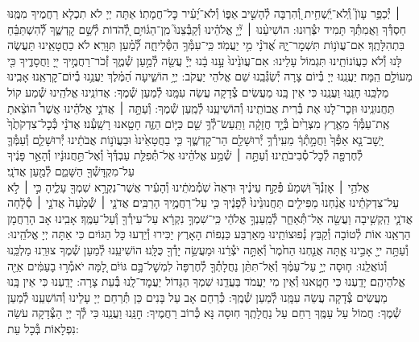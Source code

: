 \documentclass[twoside, openany, parskip=half, 11pt]{book}
\begin{document}
׀ יְ֯כַפֵּ֥ר עָוֺן֮ וְֽ֯לֹא־יַֽ֫שְׁחִ֥ית וְ֭֯הִרְבָּה לְ֯הָשִׁ֣יב אַפּ֑וֹ וְ֯לֹא־יָ֝עִ֗יר כׇּל־חֲמָתֽוֹ׃ אַתָּה יְיָ לֹא תִכְלָא רַחֲמֶיךָ מִמֶּֽנּוּ חַסְדְּ֯ךָ וַאֲמִתְּ֯ךָ תָּמִיד יִצְּ֯רֽוּנוּ: הוֹשִׁיעֵ֨נוּ ׀ יְ֘יָ֤ אֱלֹהֵ֗ינוּ וְ֯קַבְּ֯צֵנוּ֮ מִֽן־הַגּ֫וֹיִ֥ם לְ֭֯הֹדוֹת לְ֯שֵׁ֣ם קׇדְשֶׁ֑ךָ לְ֯֝הִשְׁתַּבֵּ֗חַ בִּתְהִלָּתֶֽךָ׃
אִם־עֲוֺנ֥וֹת תִּשְׁמׇר־יָ֑הּ אֲ֝דֹנָ֗י מִ֣י יַעֲמֹֽד׃ כִּֽי־עִמְּ֯ךָ֥ הַסְּ֯לִיחָ֑ה לְ֯֝מַ֗עַן תִּוָּרֵֽא׃ לֹא כַחֲטָאֵֽינוּ תַּעֲשֶׂה לָּנוּ וְ֯לֹא כַעֲוֹנוֹתֵֽינוּ תִּגְמוֹל עָלֵינוּ:
אִם־עֲוֺנֵ֙ינוּ֙ עָ֣נוּ בָ֔נוּ יְיָ֕ עֲשֵׂ֖ה לְ֯מַ֣עַן שְׁ֯מֶ֑ךָ זְ֯כֹר־רַחֲמֶ֣יךָ ייָ֭ וַחֲסָדֶ֑יךָ כִּ֖י מֵעוֹלָ֣ם הֵֽמָּה׃ יַעֲנֵֽנוּ יְיָ בְּ֯יוֹם צָרָה יְ֯שַׂגְּ֯בֵֽנוּ שֵׁם אֱלֹהֵי יַעֲקֹב:
יְיָ֥  הוֹשִׁ֑יעָה הַ֝מֶּ֗לֶךְ יַעֲנֵ֥נוּ בְ֯יוֹם־קׇרְאֵֽנוּ׃
אָבִֽינוּ מַלְכֵּֽנוּ חׇנֵּֽנוּ וַעֲנֵֽנוּ כִּי אֵין בָּֽנוּ מַעֲשִׂים צְ֯דָקָה עֲשֵׂה עִמָּֽנוּ לְ֯מַעַן שְׁ֯מֶךָ:
אֲדוֹנֵֽינוּ אֱלֹהֵֽינוּ שְׁ֯מַע קוֹל תַּחֲנוּנֵֽינוּ וּזְכׇר־לָנוּ אֶת בְּ֯רִית אֲבוֹתֵֽינוּ וְ֯הוֹשִׁיעֵֽנוּ לְ֯מַֽעַן שְׁ֯מֶךָ:
וְ֯עַתָּ֣ה ׀ אֲדֹנָ֣י אֱלֹהֵ֗ינוּ אֲשֶׁר֩ הוֹצֵ֨אתָ אֶֽת־עַמְּ֯ךָ֜ מֵאֶ֤רֶץ מִצְרַ֙יִם֙ בְּ֯יָ֣ד חֲזָקָ֔ה וַתַּֽעַשׂ־לְ֯ךָ֥ שֵׁ֖ם כַּיּ֣וֹם הַזֶּ֑ה חָטָ֖אנוּ רָשָֽׁעְ֯נוּ׃ אֲדֹנָ֗י כְּ֯כׇל־צִדְקֹתֶ֙ךָ֙ יָֽשׇׁב־נָ֤א אַפְּ֯ךָ֙ וַחֲמָ֣תְ֯ךָ֔ מֵעִֽירְ֯ךָ֥ יְ֯רוּשָׁלַ֖‍ִם הַר־קׇדְשֶׁ֑ךָ כִּ֤י בַחֲטָאֵ֙ינוּ֙ וּבַעֲוֺנ֣וֹת אֲבֹתֵ֔ינוּ יְ֯רוּשָׁלַ֧‍ִם וְ֯עַמְּ֯ךָ֛ לְ֯חֶרְפָּ֖ה לְ֯כׇל־סְ֯בִיבֹתֵֽינוּ׃ וְ֯עַתָּ֣ה ׀ שְׁ֯מַ֣ע אֱלֹהֵ֗ינוּ אֶל־תְּ֯פִלַּ֤ת עַבְדְּ֯ךָ֙ וְ֯אֶל־תַּ֣חֲנוּנָ֔יו וְ֯הָאֵ֣ר פָּנֶ֔יךָ עַל־מִקְדָּשְׁ֯ךָ֖ הַשָּׁמֵ֑ם לְ֯מַ֖עַן אֲדֹנָֽי׃\\
אֱלֹהַ֥י ׀ אׇזְנְ֯ךָ֮ וּֽשְׁמָע֒ פְּ֯קַ֣ח עֵינֶ֗יךָ וּרְאֵה֙ שֹֽׁמְ֯מֹתֵ֔ינוּ וְ֯הָעִ֕יר אֲשֶׁר־נִקְרָ֥א שִׁמְךָ֖ עָלֶ֑יהָ כִּ֣י ׀ לֹ֣א עַל־צִדְקֹתֵ֗ינוּ אֲנַ֨חְנוּ מַפִּילִ֤ים תַּחֲנוּנֵ֙ינוּ֙ לְ֯פָנֶ֔יךָ כִּ֖י עַל־רַחֲמֶ֥יךָ הָרַבִּֽים׃ אֲדֹנָ֤י ׀ שְׁ֯מָ֙עָה֙ אֲדֹנָ֣י ׀ סְ֯לָ֔חָה אֲדֹנָ֛י הַֽקְשִׁ֥יבָה וַעֲשֵׂ֖ה אַל־תְּ֯אַחַ֑ר לְ֯מַֽעַנְךָ֣ אֱלֹהַ֔י כִּֽי־שִׁמְךָ֣ נִקְרָ֔א עַל־עִירְ֯ךָ֖ וְ֯עַל־עַמֶּֽךָ׃ אָבִֽינוּ אָב הָרַחֲמָן הַרְאֵֽנוּ אוֹת לְ֯טוֹבָה וְ֯קַבֵּץ נְ֯פוּצוֹתֵֽינוּ מֵאַרְבַּע כַּנְפוֹת הָאָרֶץ יַכִּירוּ וְ֯יֵדְעוּ כָּל הַגּוֹיִם כִּי אַתָּה יְיָ אֱלֹהֵֽינוּ:
וְ֯עַתָּ֥ה ייָ֖ אָבִ֣ינוּ אָ֑תָּה אֲנַ֤חְנוּ הַחֹ֙מֶר֙ וְ֯אַתָּ֣ה יֹצְ֯רֵ֔נוּ וּמַעֲשֵׂ֥ה יָדְ֯ךָ֖ כֻּלָּֽנוּ׃ הוֹשִׁיעֵֽנוּ לְ֯מַעַן שְׁ֯מֶךָ צוּרֵֽנוּ מַלְכֵּֽנוּ וְ֯גוֹאֲלֵֽנוּ:
ח֧וּסָה יְיָ֣ עַל־עַמֶּ֗ךָ וְ֯אַל־תִּתֵּ֨ן נַחֲלָתְ֯ךָ֤ לְ֯חֶרְפָּה֙ לִמְשׇׁל־בָּ֣ם גּוֹיִ֔ם לָ֚מָּה יֹאמְ֯ר֣וּ בָעַמִּ֔ים אַיֵּ֖ה אֱלֹהֵיהֶֽם׃ יָדַֽעְנוּ כִּי חָטָֽאנוּ וְ֯אֵין מִי יַעֲמֹד בַּעֲדֵֽנוּ שִׁמְךָ הַגָּדוֹל יַעֲמׇד־לָֽנוּ בְּ֯עֵת צָרָה: יָדַֽעְנוּ כִּי אֵין בָּֽנוּ מַעֲשִׂים צְ֯דָקָה עֲשֵׂה עִמָּֽנוּ לְ֯מַעַן שְׁ֯מֶֽךָ: כְּ֯רַחֵם אָב עַל בָּנִים כֵּן תְּ֯רַחֵם יְיָ עָלֵינוּ וְ֯הוֹשִׁעֵֽנוּ לְ֯מַעַן שְׁ֯מֶךָ: חֲמוֹל עַל עַמֶּֽךָ רַחֵם עַל נַחֲלָתֶֽךָ חֽוּסָה נָּא כְּ֯רוֹב רַחֲמֶיךָ: חׇנֵּֽנוּ וַעֲנֵֽנוּ כִּי לְ֯ךָ יְיָ הַצְּ֯דָקָה עֹשֵׂה נִפְלָאוֹת בְּ֯כָל עֵת:\\
\end{document}
